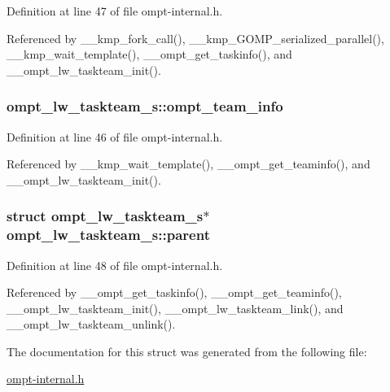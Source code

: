 Definition at line 47 of file ompt-\/internal.\-h.



Referenced by \-\_\-\-\_\-kmp\-\_\-fork\-\_\-call(), \-\_\-\-\_\-kmp\-\_\-\-G\-O\-M\-P\-\_\-serialized\-\_\-parallel(), \-\_\-\-\_\-kmp\-\_\-wait\-\_\-template(), \-\_\-\-\_\-ompt\-\_\-get\-\_\-taskinfo(), and \-\_\-\-\_\-ompt\-\_\-lw\-\_\-taskteam\-\_\-init().

\hypertarget{structompt__lw__taskteam__s_a548ab004e1bed7cea20532f1e168ce3d}{
\subsubsection[{ompt\-\_\-team\-\_\-info}]{ ompt\-\_\-lw\-\_\-taskteam\-\_\-s\-::ompt\-\_\-team\-\_\-info}}\label{structompt__lw__taskteam__s_a548ab004e1bed7cea20532f1e168ce3d}


Definition at line 46 of file ompt-\/internal.\-h.



Referenced by \-\_\-\-\_\-kmp\-\_\-wait\-\_\-template(), \-\_\-\-\_\-ompt\-\_\-get\-\_\-teaminfo(), and \-\_\-\-\_\-ompt\-\_\-lw\-\_\-taskteam\-\_\-init().

\hypertarget{structompt__lw__taskteam__s_ac945aa2df678ab63f63a5f23ea796974}{
\subsubsection[{parent}]{\setlength{\rightskip}{0pt plus 5cm}struct {\bf ompt\-\_\-lw\-\_\-taskteam\-\_\-s}$\ast$ ompt\-\_\-lw\-\_\-taskteam\-\_\-s\-::parent}}\label{structompt__lw__taskteam__s_ac945aa2df678ab63f63a5f23ea796974}


Definition at line 48 of file ompt-\/internal.\-h.



Referenced by \-\_\-\-\_\-ompt\-\_\-get\-\_\-taskinfo(), \-\_\-\-\_\-ompt\-\_\-get\-\_\-teaminfo(), \-\_\-\-\_\-ompt\-\_\-lw\-\_\-taskteam\-\_\-init(), \-\_\-\-\_\-ompt\-\_\-lw\-\_\-taskteam\-\_\-link(), and \-\_\-\-\_\-ompt\-\_\-lw\-\_\-taskteam\-\_\-unlink().



The documentation for this struct was generated from the following file\-:\begin{DoxyCompactItemize}
\item 
\hyperlink{ompt-internal_8h}{ompt-\/internal.\-h}\end{DoxyCompactItemize}
